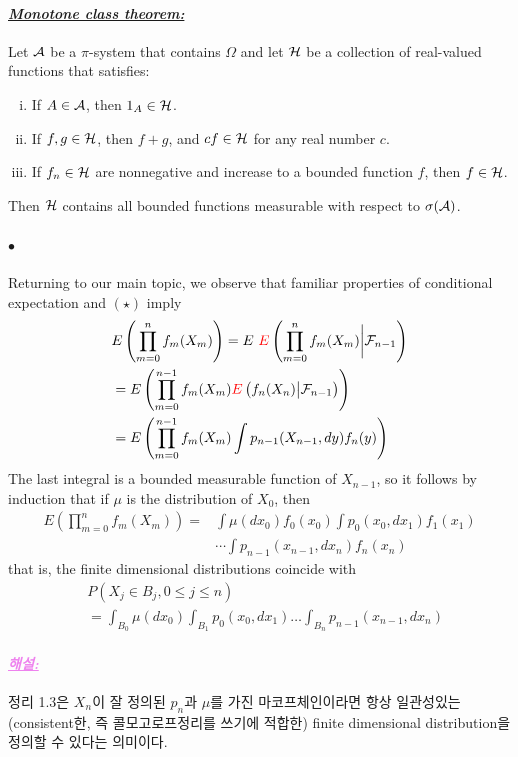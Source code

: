 \documentclass[12pt,oneside,english,a4paper]{article}
\def\ck{\paragraph{\LARGE$\bullet$}\LARGE}
\newcommand{\para}[1]{\paragraph{\LARGE\it\underline{\textbf{#1:}}}\LARGE}
\newcommand{\paraviolet}[1]{\paragraph{\LARGE\textcolor{violet}{\it\underline{\textbf{#1:}}}}\LARGE}
\begin{document}
\para{Monotone class theorem} Let ${\cal A}$ be a $\pi$-system that
contains $\Omega$ and let ${\cal H}$ be a collection of real-valued functions that satisfies: 
\begin{enumerate}[(i)]
\item If $A \in{\cal A}$, then $1_A \in {\cal H}$.
\item If $f,g \in {\cal H}$, then $f + g$, and $cf \in {\cal H}$ for any real number $c$.
\item If $f_n \in {\cal H}$ are nonnegative and increase to a bounded function $f$, then $f \in {\cal H}$.
\end{enumerate}
Then ${\cal H}$ contains all bounded functions measurable with respect to $\sigma({\cal A})$.

\ck Returning to our main topic, we observe that familiar properties of 
conditional expectation and $(\star)$ imply 
\begin{align*}
&E\left(\prod_{m=0}^{n}f_m(X_m)\right)=E~ \textcolor{red}{E} \left(\prod_{m=0}^{n}f_m(X_m)\bigg | {\cal F}_{n-1}\right) \\ 
&= E \left(\prod_{m=0}^{n-1}f_m(X_m)\textcolor{red}{E}\left(f_n(X_n) \big| {\cal F}_{n-1}\right)\right) \\
&= E \left(\prod_{m=0}^{n-1}f_m(X_m)\int p_{n-1}(X_{n-1},dy)f_n(y)\right)  
\end{align*}
The last integral is a bounded measurable function of $X_{n-1}$, so it follows by induction that if $\mu$ is the distribution of $X_0$, then
\begin{align*}
E\left(\prod_{m=0}^{n}f_m(X_m)\right)=& \int\mu(dx_0)f_0(x_0)\int p_0(x_0,dx_1)f_1(x_1)\\ 
& \cdots\int p_{n-1}(x_{n-1},dx_n)f_n(x_n)
\end{align*}
that is, the finite dimensional distributions coincide with 
\begin{align*}
&P(X_j\in B_j, 0\leq j\leq n)\\
&=\int_{B_0}\mu(dx_0)\int_{B_1}p_0(x_0,dx_1)\dots\int_{B_n}p_{n-1}(x_{n-1},dx_n)
\end{align*}

\paraviolet{해설} 정리 1.3은 $X_n$이 잘 정의된 $p_n$과 $\mu$를 가진 마코프체인이라면 항상 일관성있는 (consistent한, 즉 콜모고로프정리를 쓰기에 적합한) finite dimensional distribution을 정의할 수 있다는 의미이다. 
\end{document}
